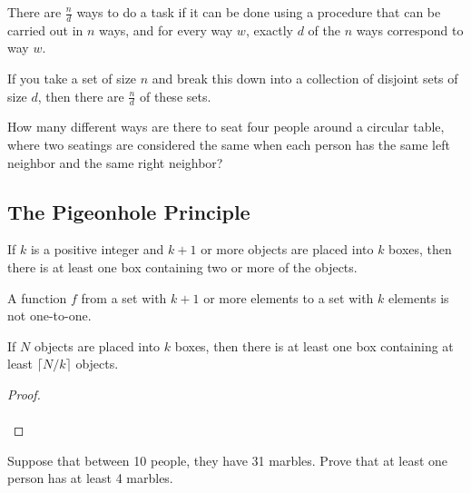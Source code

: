 \begin{defn}
    There are $\frac{n}{d}$ ways to do a task if it can be done using a procedure that can be carried out in $n$ ways, and for every way $w$, exactly $d$ of the $n$ ways correspond to way $w$.
\end{defn}
\begin{exmp}
If you take a set of size $n$ and break this down into a collection of disjoint sets of size $d$, then there are $\frac{n}{d}$ of these sets.

\end{exmp}
\begin{exmp}
    How many different ways are there to seat four people around a circular table, where two seatings are considered the same when each person has the same left neighbor and the same right neighbor?

    \vspace{2cm}
\end{exmp}
\subsection{The Pigeonhole Principle}

\begin{defn}
    If $k$ is a positive integer and $k + 1$ or more objects are placed into $k$ boxes, then there is at least one box containing two or more of the objects.
\end{defn}
\begin{exmp}

    A function $f$ from a set with $k + 1$ or more elements to a set with $k$ elements is not one-to-one.

\end{exmp}
\begin{thm}
    If $N$ objects are placed into $k$ boxes, then there is at least one box containing at least $\lceil N/k \rceil$ objects.
\end{thm}
\begin{proof} $ $\\
\vspace{4cm}
$ $\\
\end{proof}

\begin{exmp} Suppose that between 10 people, they have 31 marbles. Prove that at least one person has at least 4 marbles.
\vspace{2cm}
\end{exmp}

